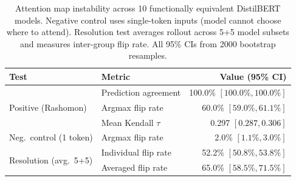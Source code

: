 \begin{table}[t]
\centering
\caption{Attention map instability across 10 functionally equivalent DistilBERT models.
  Negative control uses single-token inputs (model cannot choose where to attend).
  Resolution test averages rollout across 5+5 model subsets and measures inter-group flip rate.
  All 95\% CIs from 2000 bootstrap resamples.}
\label{tab:attention}
\begin{tabular}{llr}
\toprule
Test & Metric & Value (95\% CI) \\
\midrule
\multirow{3}{*}{Positive (Rashomon)} &
  Prediction agreement & 100.0\% $[100.0\%, 100.0\%]$ \\
& Argmax flip rate & 60.0\% $[59.0\%, 61.1\%]$ \\
& Mean Kendall $\tau$ & 0.297 $[0.287, 0.306]$ \\
\midrule
Neg.\ control (1 token) &
  Argmax flip rate & 2.0\% $[1.1\%, 3.0\%]$ \\
\midrule
\multirow{2}{*}{Resolution (avg.\ 5+5)} &
  Individual flip rate & 52.2\% $[50.8\%, 53.8\%]$ \\
& Averaged flip rate & 65.0\% $[58.5\%, 71.5\%]$ \\
\bottomrule
\end{tabular}
\end{table}

